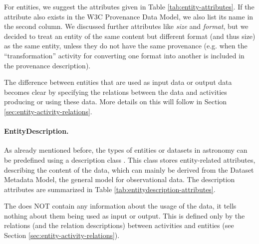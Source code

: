 For entities, we suggest the attributes given in Table 
\ref{tab:entity-attributes}. If the attribute also exists in the W3C 
Provenance Data Model, we also list its name in the second column.
We discussed further attributes like \emph{size} and \emph{format}, but we decided to treat an
entity of the same content but different format (and thus size) as the same entity,
unless they do not have the same provenance (e.g. when the ``transformation'' activity
for converting one format into another is included in the provenance description).


The difference between entities that are used as input data or output data 
becomes clear by specifying the relations between the data and activities producing or using these data.
More details on this will follow in Section \ref{sec:entity-activity-relations}.

\paragraph{EntityDescription.}
As already mentioned before, the types of entities or datasets in astronomy 
can be predefined using a description
class .
This class stores entity-related 
attributes, describing the content of the data, which can mainly be derived from 
the Dataset Metadata Model, the general model for observational data.
The description attributes are summarized in Table 
\ref{tab:entitydescription-attributes}.

The  does NOT contain any information about the usage 
of the data, it tells nothing about them being used as input or output. This is 
defined only by the relations (and the relation descriptions) between activities
and entities (see Section \ref{sec:entity-activity-relations}).


